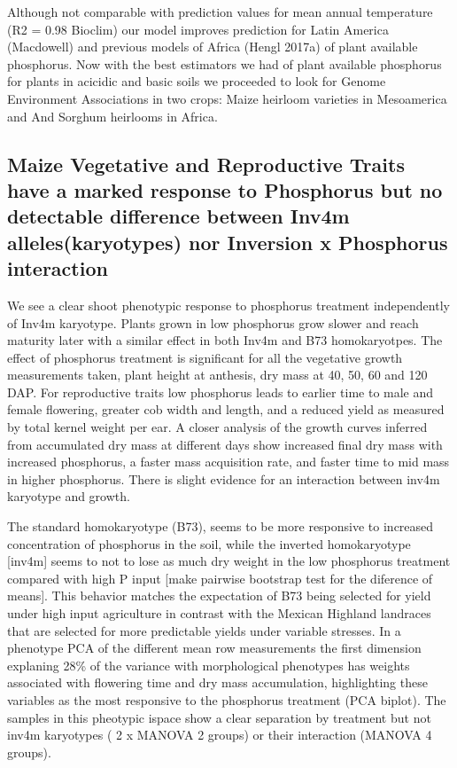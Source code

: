 Although not comparable with prediction values for mean annual temperature (R2 = 0.98 Bioclim) our model improves prediction for Latin America (Macdowell) and previous models of Africa (Hengl 2017a) of plant available phosphorus.
Now with the best estimators we had of plant available phosphorus for plants in acicidic and basic soils we proceeded to look for Genome Environment Associations in two crops: Maize heirloom varieties in Mesoamerica and And Sorghum heirlooms in Africa.


\subsection{Maize Vegetative and Reproductive Traits have a marked response to Phosphorus but no detectable difference between Inv4m alleles(karyotypes) nor  Inversion x Phosphorus interaction}

We see a clear shoot phenotypic response to phosphorus treatment independently of Inv4m karyotype. 
Plants grown in low phosphorus grow slower and reach maturity later with a similar effect in both Inv4m and B73 homokaryotpes. 
The effect of phosphorus treatment is significant for all the vegetative growth measurements taken, plant height at anthesis, dry mass at 40, 50, 60 and 120 DAP.  
For reproductive traits low phosphorus leads to earlier time to male and female flowering, greater cob width and length, and a reduced yield as measured by total kernel weight per ear.
A closer analysis of the growth curves inferred from accumulated dry mass at different days show increased final dry mass  with increased phosphorus, a faster mass acquisition rate, and faster time to mid mass in higher phosphorus. 
There is slight evidence for an interaction between inv4m karyotype and growth. 

The standard homokaryotype (B73), seems to be more responsive to increased concentration of phosphorus in the soil, while the  inverted homokaryotype [inv4m] seems to not to lose as much dry weight in the low phosphorus treatment compared with high P input [make pairwise bootstrap test for the diference of means]. 
This behavior matches the expectation of B73 being selected for yield under high input agriculture in contrast with the Mexican Highland landraces that are selected for more predictable yields under variable stresses. In a phenotype PCA of the different mean row measurements the first dimension explaning 28\% of the variance with morphological phenotypes has weights associated with flowering time and dry mass accumulation, highlighting these variables as the most responsive to the phosphorus treatment (PCA biplot). 
The samples in this pheotypic ispace show a clear separation by treatment  but not  inv4m karyotypes ( 2 x MANOVA 2 groups) or their interaction (MANOVA 4 groups).

